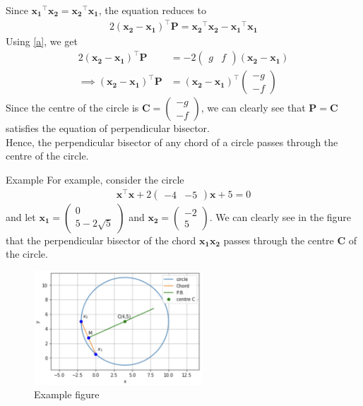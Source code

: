\documentclass{beamer}
\newcommand{\myvec}[1]{\ensuremath{\begin{pmatrix}#1\end{pmatrix}}}
\renewcommand{\vec}[1]{\mathbf{#1}}
\begin{document}
\begin{frame}
Since $\vec{x_1}^\top\vec{x_2}=\vec{x_2}^\top\vec{x_1}$, the equation reduces to
\begin{align}
    2\left(\vec{x_2}-\vec{x_1}\right)^\top\vec{P}=\vec{x_2}^\top\vec{x_2}-\vec{x_1}^\top\vec{x_1}
\end{align}
Using \eqref{a}, we get
\begin{align}
    2\left(\vec{x_2}-\vec{x_1}\right)^\top\vec{P}&=-2\myvec{g&f}(\vec{x_2}-\vec{x_1})\\
    \implies \left(\vec{x_2}-\vec{x_1}\right)^\top\vec{P}&=\left(\vec{x_2}-\vec{x_1}\right)^\top\myvec{-g\\-f}
\end{align}
Since the centre of the circle is $\vec{C}=\myvec{-g\\-f}$, we can clearly see that $\vec{P}=\vec{C}$ satisfies the equation of perpendicular bisector.\\

Hence, the perpendicular bisector of any chord of a circle passes through the centre of the circle.
\end{frame}
\begin{frame}{Example}
For example, consider the circle
\begin{align}
    \vec{x}^\top\vec{x}+2\myvec{-4&-5}\vec{x}+5=0
\end{align}
and let $\vec{x_1}=\myvec{0\\5-2\sqrt{5}}$ and $\vec{x_2}=\myvec{-2\\5}$.
We can clearly see in the figure that the perpendicular bisector of the chord $\vec{x_1x_2}$ passes through the centre $\vec{C}$ of the circle.

\begin{figure}[h!]
    \centering
    \includegraphics[width=6.3cm]{example_figure.png}
    \caption{Example figure}
\end{figure}
\end{frame}
\end{document}
